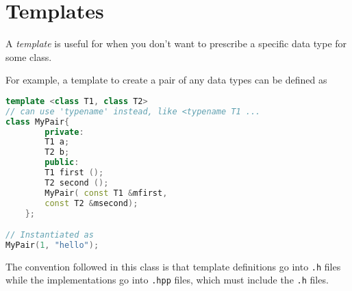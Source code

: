 \section{Templates}

A \emph{template} is useful for when you don't want
to prescribe a specific data type for some class.

For example, a template to create a pair
of any data types can be defined as
\begin{lstlisting}[language=C++,caption=-> Operator]
template <class T1, class T2> 
// can use 'typename' instead, like <typename T1 ...
class MyPair{
        private:
        T1 a;
        T2 b;
        public:
        T1 first ();
        T2 second ();
        MyPair( const T1 &mfirst,
        const T2 &msecond);
    };

// Instantiated as 
MyPair(1, "hello");
\end{lstlisting}

The convention followed in this class is that template definitions
go into \texttt{.h} files while the implementations go into \texttt{.hpp}
files, which must include the \texttt{.h} files.